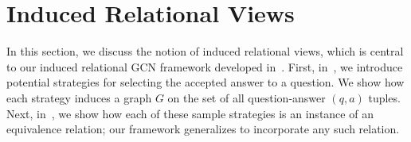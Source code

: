 
\section{Induced Relational Views}
\label{sec:Induced Relational Views}
In this section, we discuss the notion of induced relational views, which is central to our induced relational GCN framework developed in~. First, in~, we introduce potential strategies for selecting the accepted answer to a question. We show how each strategy induces a graph $G$ on the set of all question-answer $(q,a)$ tuples. Next, in~, we show how each of these sample strategies is an instance of an equivalence relation; our framework generalizes to incorporate any such relation.





